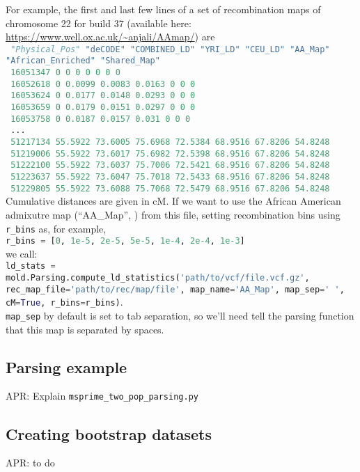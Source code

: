 \documentclass[11pt]{article}
\makeatletter
\renewcommand{\cite}{\citep}
\newcommand{\comment}[1]{{\color{blue}APR: #1}}
\newcommand{\py}[1]{\lstinline[breaklines=true,language=Python, showstringspaces=False]@#1@}
\makeatother
\begin{document}
For example, the first and last few lines of a set of recombination maps of chromosome 22 for build 37 (available here: \url{https://www.well.ox.ac.uk/~anjali/AAmap/}) are\\\small
\py{
"Physical_Pos" "deCODE" "COMBINED_LD" "YRI_LD" "CEU_LD" "AA_Map" "African_Enriched" "Shared_Map"}\\\py{
16051347 0 0 0 0 0 0 0}\\\py{
16052618 0 0.0099 0.0083 0.0163 0 0 0}\\\py{
16053624 0 0.0177 0.0148 0.0293 0 0 0}\\\py{
16053659 0 0.0179 0.0151 0.0297 0 0 0}\\\py{
16053758 0 0.0187 0.0157 0.031 0 0 0}\\\py{
...}\\\py{
51217134 55.5922 73.6005 75.6968 72.5384 68.9516 67.8206 54.8248}\\\py{
51219006 55.5922 73.6017 75.6982 72.5398 68.9516 67.8206 54.8248}\\\py{
51222100 55.5922 73.6037 75.7006 72.5421 68.9516 67.8206 54.8248}\\\py{
51223637 55.5922 73.6047 75.7018 72.5433 68.9516 67.8206 54.8248}\\\py{
51229805 55.5922 73.6088 75.7068 72.5479 68.9516 67.8206 54.8248}\\
\normalsize
Cumulative distances are given in cM.
If we want to use the African American admixutre map (``AA\_Map'', \cite{Hinch2011}) from this file, 
setting recombination bins using \py{r_bins} as, for example,\\
\py{r_bins = [0, 1e-5, 2e-5, 5e-5, 1e-4, 2e-4, 1e-3]}\\
we call:\\
\py{ld_stats = mold.Parsing.compute_ld_statistics('path/to/vcf/file.vcf.gz', rec_map_file='path/to/rec/map/file', map_name='AA_Map', map_sep=' ', cM=True, r_bins=r_bins)}.\\
\py{map_sep} by default is set to tab separation, so we'll need tell the parsing function that this map is separated by spaces.

\subsection{Parsing example}

\comment{Explain \py{msprime_two_pop_parsing.py}}

\subsection{Creating bootstrap datasets}
\comment{to do}
\end{document}
